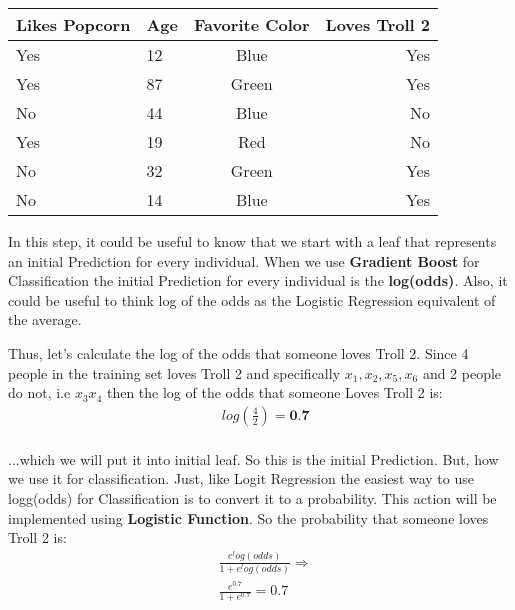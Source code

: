 \documentclass[12pt, a4paper]{article} %
\begin{document}
\begin{table}[h!]
\begin{center}
\begin{tabular}{m|l|c|r} %
    
    \hline
    \hline
    
         \textbf{Likes Popcorn}
     
       & \textbf{Age}
      
       & \textbf{Favorite Color}
       
       & \textbf{Loves Troll 2}
       
      \\
      
      \hline
      \hline
      
      Yes & 12  & Blue  & Yes\\
      Yes & 87  & Green & Yes\\
      No  & 44  & Blue  & No\\
      Yes & 19  & Red   & No\\
      No  & 32  & Green & Yes\\
      No  & 14  & Blue  & Yes\\
      
      \hline
      \hline
      
\end{tabular}
\end{center}
\end{table}

In this step, it could be useful to know that we start with a leaf that represents an initial Prediction for every individual. When we use \textbf{Gradient Boost} for Classification the initial Prediction for every individual is the \textbf{log(odds)}. Also, it could be useful to think log of the odds as the Logistic Regression equivalent of the average.

Thus, let's calculate the log of the odds that someone loves Troll 2. Since 4 people in the training set loves Troll 2 and specifically $x_{1}, x_{2}, x_{5}, x_{6}$ and 2 people do not, i.e $x_{3} x_{4}$ then the log of the odds that someone Loves Troll 2 is:
\begin{align*}
    & log(\frac{4}{2}) = \textbf{0.7}\\
\end{align*}

...which we will put it into initial leaf. So this is the initial Prediction. But, how we use it for classification. Just, like Logit Regression the easiest way to use logg(odds) for Classification is to convert it to a probability. This action will be implemented using \textbf{Logistic Function}. So the probability that someone loves Troll 2 is:
\begin{align*}
    & \frac{e^log(odds)}{1 + e^log(odds)} \Rightarrow\\
    & \frac{e^0.7}{1 + e^0.7} = 0.7
\end{align*}
\end{document}
